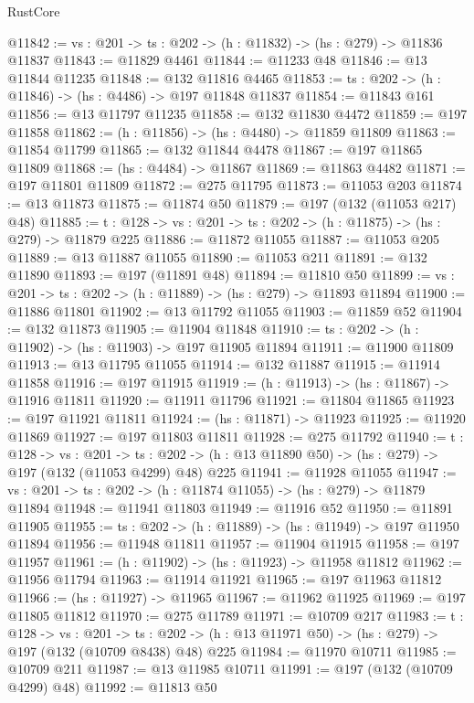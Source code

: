 \begin{lexlean}{RustCore}
\begin{coremodule}
@11842 := {vs : @201} -> {ts : @202} -> (h : @11832) -> (hs : @279) -> @11836 @11837
@11843 := @11829 @4461
@11844 := @11233 @48
@11846 := @13 @11844 @11235
@11848 := @132 @11816 @4465
@11853 := {ts : @202} -> (h : @11846) -> (hs : @4486) -> @197 @11848 @11837
@11854 := @11843 @161
@11856 := @13 @11797 @11235
@11858 := @132 @11830 @4472
@11859 := @197 @11858
@11862 := (h : @11856) -> (hs : @4480) -> @11859 @11809
@11863 := @11854 @11799
@11865 := @132 @11844 @4478
@11867 := @197 @11865 @11809
@11868 := (hs : @4484) -> @11867
@11869 := @11863 @4482
@11871 := @197 @11801 @11809
@11872 := @275 @11795
@11873 := @11053 @203
@11874 := @13 @11873
@11875 := @11874 @50
@11879 := @197 (@132 (@11053 @217) @48)
@11885 := {t : @128} -> {vs : @201} -> {ts : @202} -> (h : @11875) -> (hs : @279) -> @11879 @225
@11886 := @11872 @11055
@11887 := @11053 @205
@11889 := @13 @11887 @11055
@11890 := @11053 @211
@11891 := @132 @11890
@11893 := @197 (@11891 @48)
@11894 := @11810 @50
@11899 := {vs : @201} -> {ts : @202} -> (h : @11889) -> (hs : @279) -> @11893 @11894
@11900 := @11886 @11801
@11902 := @13 @11792 @11055
@11903 := @11859 @52
@11904 := @132 @11873
@11905 := @11904 @11848
@11910 := {ts : @202} -> (h : @11902) -> (hs : @11903) -> @197 @11905 @11894
@11911 := @11900 @11809
@11913 := @13 @11795 @11055
@11914 := @132 @11887
@11915 := @11914 @11858
@11916 := @197 @11915
@11919 := (h : @11913) -> (hs : @11867) -> @11916 @11811
@11920 := @11911 @11796
@11921 := @11804 @11865
@11923 := @197 @11921 @11811
@11924 := (hs : @11871) -> @11923
@11925 := @11920 @11869
@11927 := @197 @11803 @11811
@11928 := @275 @11792
@11940 := {t : @128} ->
  {vs : @201} ->
  {ts : @202} -> (h : @13 @11890 @50) -> (hs : @279) -> @197 (@132 (@11053 @4299) @48) @225
@11941 := @11928 @11055
@11947 := {vs : @201} -> {ts : @202} -> (h : @11874 @11055) -> (hs : @279) -> @11879 @11894
@11948 := @11941 @11803
@11949 := @11916 @52
@11950 := @11891 @11905
@11955 := {ts : @202} -> (h : @11889) -> (hs : @11949) -> @197 @11950 @11894
@11956 := @11948 @11811
@11957 := @11904 @11915
@11958 := @197 @11957
@11961 := (h : @11902) -> (hs : @11923) -> @11958 @11812
@11962 := @11956 @11794
@11963 := @11914 @11921
@11965 := @197 @11963 @11812
@11966 := (hs : @11927) -> @11965
@11967 := @11962 @11925
@11969 := @197 @11805 @11812
@11970 := @275 @11789
@11971 := @10709 @217
@11983 := {t : @128} ->
  {vs : @201} ->
  {ts : @202} -> (h : @13 @11971 @50) -> (hs : @279) -> @197 (@132 (@10709 @8438) @48) @225
@11984 := @11970 @10711
@11985 := @10709 @211
@11987 := @13 @11985 @10711
@11991 := @197 (@132 (@10709 @4299) @48)
@11992 := @11813 @50

\end{coremodule}
\end{lexlean}
